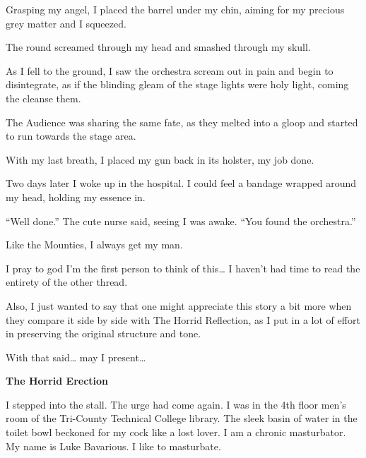 Grasping my angel, I placed the barrel under my chin, aiming for my
precious grey matter and I squeezed.



The round screamed through my head and smashed through my
skull.



As I fell to the ground, I saw the orchestra scream out in pain and
begin to disintegrate, as if the blinding gleam of the stage lights
were holy light, coming the cleanse them.

The Audience was sharing the same fate, as they melted into a gloop
and started to run towards the stage area.

With my last breath, I placed my gun back in its holster, my job
done.



Two days later I woke up in the hospital. I could feel a bandage
wrapped around my head, holding my essence in.



``Well done.'' The cute nurse said, seeing I was awake.
``You found the orchestra.''



Like the Mounties, I always get my man. 

 





I pray to god I'm the first person to think of this{\ldots} I haven't
had time to read the entirety of the other thread.



Also, I just wanted to say that one might appreciate this story a
bit more when they compare it side by side with The Horrid
Reflection, as I put in a lot of effort in preserving the original
structure and tone.



With that said{\ldots} may I present{\ldots}



{\bf The Horrid Erection}



I stepped into the stall. The urge had come again. I was in the 4th
floor men's room of the Tri-County Technical College library.
The sleek basin of water in the toilet bowl beckoned for my cock
like a lost lover. I am a chronic masturbator. My name is Luke
Bavarious. I like to masturbate.




